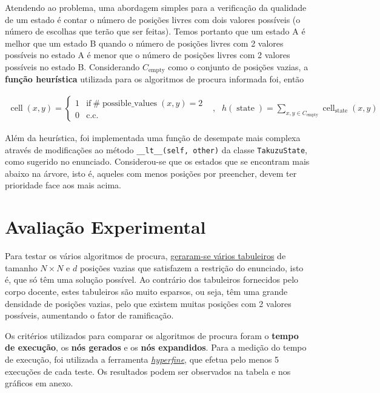 \documentclass[12pt,a4paper]{article}
\newcommand{\op}{\operatorname}
\begin{document}
Atendendo ao problema, uma abordagem simples para a verificação da qualidade de
um estado é contar o número de posições livres com dois valores possíveis
(o número de escolhas que terão que ser feitas).
Temos portanto que um estado A é melhor que um estado B quando
o número de posições livres com 2 valores possíveis no estado A é menor que
o número de posições livres com 2 valores possíveis no estado B.
Considerando \(C_{\op{empty}}\) como o conjunto de posições vazias, a
\textbf{função heurística} utilizada para os algoritmos de procura informada foi, então

\[
  \begin{aligned}
    \op{cell}(x, y) = \begin{cases}
                        1 & \text{if}~\#\op{possible\_values}(x, y) = 2 \\
                        0 & \text{c.c.}
                      \end{cases}
     & , &
    h(\op{state}) = \sum_{x,y\in C_{\op{empty}}} \op{cell}_{\op{state}}(x, y)
  \end{aligned}
\]

Além da heurística, foi implementada uma função de desempate mais complexa através de
modificações ao método \texttt{\_\_lt\_\_(self, other)} da classe \texttt{TakuzuState}, como sugerido no enunciado.
Considerou-se que os estados que se encontram mais abaixo na árvore, isto é, aqueles com
menos posições por preencher, devem ter prioridade face aos mais acima.

\section{Avaliação Experimental}

Para testar os vários algoritmos de procura,
\href{https://gist.github.com/D-Card/68d32c6371abfce61dc5bbaabd633f27}{geraram-se vários tabuleiros} de tamanho \(N \times N\)
e \(d\) posições vazias que satisfazem a restrição do enunciado, isto é, que só têm uma solução possível.
Ao contrário dos tabuleiros fornecidos pelo corpo docente, estes tabuleiros são muito
esparsos, ou seja, têm uma grande densidade de posições vazias, pelo que existem muitas
posições com 2 valores possíveis, aumentando o fator de ramificação.

Os critérios utilizados para comparar os algoritmos de procura foram o \textbf{tempo de execução},
os \textbf{nós gerados} e os \textbf{nós expandidos}.
Para a medição do tempo de execução, foi utilizada a ferramenta \href{https://github.com/sharkdp/hyperfine}{\textit{hyperfine}},
que efetua pelo menos 5 execuções de cada teste.
Os resultados podem ser observados na tabela e nos gráficos em anexo.
\end{document}
